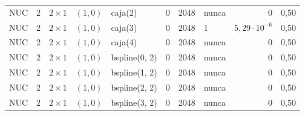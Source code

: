 \begin{tabular}{llllllrlrr}
NUC & 2 & $2\times1$ & $(1, 0)$ & caja(2) & 0 & 2048 & nunca & $0$ & 0,50 \\
NUC & 2 & $2\times1$ & $(1, 0)$ & caja(3) & 0 & 2048 & 1 & $5{,}29 \cdot 10^{-6}$ & 0,50 \\
NUC & 2 & $2\times1$ & $(1, 0)$ & caja(4) & 0 & 2048 & nunca & $0$ & 0,50 \\
NUC & 2 & $2\times1$ & $(1, 0)$ & bspline(0, 2) & 0 & 2048 & nunca & $0$ & 0,50 \\
NUC & 2 & $2\times1$ & $(1, 0)$ & bspline(1, 2) & 0 & 2048 & nunca & $0$ & 0,50 \\
NUC & 2 & $2\times1$ & $(1, 0)$ & bspline(2, 2) & 0 & 2048 & nunca & $0$ & 0,50 \\
NUC & 2 & $2\times1$ & $(1, 0)$ & bspline(3, 2) & 0 & 2048 & nunca & $0$ & 0,50 \\
\bottomrule
\end{tabular}
